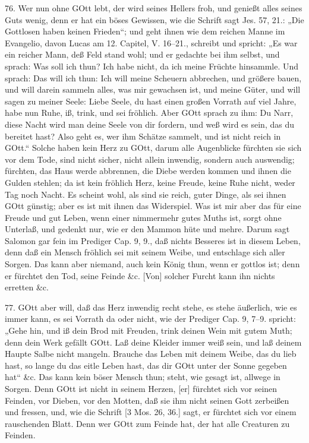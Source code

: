 76. Wer nun ohne GOtt lebt, der wird seines Hellers froh, und genießt alles seines Guts wenig, denn er hat ein böses Gewissen, wie die Schrift sagt Jes. 57, 21.: „Die Gottlosen haben keinen Frieden“; und geht ihnen wie dem reichen Manne im Evangelio, davon Lucas am 12. Capitel, V. 16–21., schreibt und spricht: „Es war ein reicher Mann, deß Feld stand wohl; und er gedachte bei ihm selbst, und sprach: Was soll ich thun? Ich habe nicht, da ich meine Früchte hinsammle. Und sprach: Das will ich thun: Ich will meine Scheuern abbrechen, und größere bauen, und will darein sammeln alles, was mir gewachsen ist, und meine Güter, und will sagen zu meiner Seele: Liebe Seele, du hast einen großen Vorrath auf viel Jahre, habe nun Ruhe, iß, trink, und sei fröhlich. Aber GOtt sprach zu ihm: Du Narr, diese Nacht wird man deine Seele von dir fordern, und weß wird es sein, das du bereitet hast? Also geht es, wer ihm Schätze sammelt, und ist nicht reich in GOtt.“ Solche haben kein Herz zu GOtt, darum alle Augenblicke fürchten sie sich vor dem Tode, sind nicht sicher, nicht allein inwendig, sondern auch auswendig; fürchten, das Haus werde abbrennen, die Diebe werden kommen und ihnen die Gulden stehlen; da ist kein fröhlich Herz, keine Freude, keine Ruhe nicht, weder Tag noch Nacht. Es scheint wohl, als sind sie reich, guter Dinge, als sei ihnen GOtt günstig; aber es ist mit ihnen das Widerspiel. Was ist mir aber das für eine Freude und gut Leben, wenn einer nimmermehr gutes Muths ist, sorgt ohne Unterlaß, und gedenkt nur, wie er den Mammon hüte und mehre. Darum sagt Salomon gar fein im Prediger Cap. 9, 9., daß nichts Besseres ist in diesem Leben, denn daß ein Mensch fröhlich sei mit seinem Weibe, und entschlage sich aller Sorgen. Das kann aber niemand, auch kein König thun, wenn er gottlos ist; denn er fürchtet den Tod, seine Feinde \&c. [Von] solcher Furcht kann ihn nichts erretten \&c.

77. GOtt aber will, daß das Herz inwendig recht stehe, es stehe äußerlich, wie es immer kann, es sei Vorrath da oder nicht, wie der Prediger Cap. 9, 7–9. spricht: „Gehe hin, und iß dein Brod mit Freuden, trink deinen Wein mit gutem Muth; denn dein Werk gefällt GOtt. Laß deine Kleider immer weiß sein, und laß deinem Haupte Salbe nicht mangeln. Brauche das Leben mit deinem Weibe, das du lieb hast, so lange du das eitle Leben hast, das dir GOtt unter der Sonne gegeben hat“ \&c. Das kann kein böser Mensch thun; steht, wie gesagt ist, allwege in Sorgen. Denn GOtt ist nicht in seinem Herzen, [er] fürchtet sich vor seinen Feinden, vor Dieben, vor den Motten, daß sie ihm nicht seinen Gott zerbeißen und fressen, und, wie die Schrift [3 Mos. 26, 36.] sagt, er fürchtet sich vor einem rauschenden Blatt. Denn wer GOtt zum Feinde hat, der hat alle Creaturen zu Feinden.

